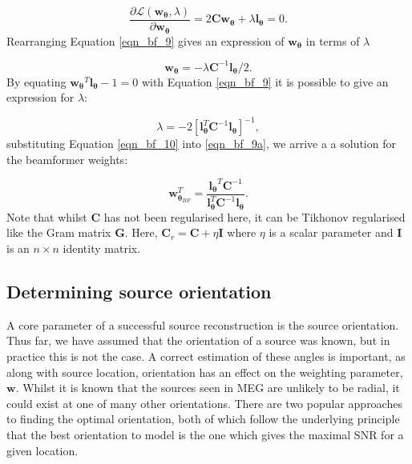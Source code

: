 \begin{equation}\label{eqn_bf_9}
\frac{\partial \mathscr{L}(\mathbf{w_\theta},\lambda )}{\partial \mathbf{w_\theta}} = 2\mathbf{C}\mathbf{w}_{\mathbf\theta} + \lambda \mathbf{l_\theta} = 0.
\end{equation} Rearranging Equation \ref{eqn_bf_9} gives an expression of $\mathbf{w_\theta}$ in terms of $\lambda$

\begin{equation}\label{eqn_bf_9a}
\mathbf{w_\theta} = -\lambda\mathbf{C}^{-1}\mathbf{l_\theta}/2.
\end{equation} By equating $\mathbf{w_\theta}^T\mathbf{l_\theta} - 1 = 0$ with Equation \ref{eqn_bf_9} it is possible to give an expression for $\lambda$: 

\begin{equation}\label{eqn_bf_10}
\lambda = -2[\mathbf{l}^T_{\mathbf\theta}\mathbf{C}^{-1}\mathbf{l}_{\mathbf\theta}]^{-1},
\end{equation} substituting Equation \ref{eqn_bf_10} into \ref{eqn_bf_9a}, we arrive a a solution for the beamformer weights:

\begin{equation}\label{eqn_weights_bf}
\mathbf{w}_{\mathbf{\theta}_{BF}}^T = \frac{\mathbf{l_\theta}^T\mathbf{C}^{-1}}{\mathbf{l}^T_{\mathbf\theta}\mathbf{C}^{-1}\mathbf{l}_{\mathbf\theta}}.
\end{equation}Note that whilst $\mathbf{C}$ has not been regularised here, it can be Tikhonov regularised like the Gram matrix $\mathbf{G}$. Here, $\mathbf{C}_r = \mathbf{C} + \eta\mathbf{I}$ where $\eta$ is a scalar parameter and $\mathbf{I}$ is an $n\times n$ identity matrix. 

\subsection{Determining source orientation}\label{sec_334}

A core parameter of a successful source reconstruction is the source orientation. Thus far, we have assumed that the orientation of a source was known, but in practice this is not the case. A correct estimation of these angles is important, as along with source location, orientation has an effect on the weighting parameter, $\mathbf{w}$. Whilst it is known that the sources seen in MEG are unlikely to be radial, it could exist at one of many other orientations. There are two popular approaches to finding the optimal orientation, both of which follow the underlying principle that the best orientation to model is the one which gives the maximal SNR for a given location.

